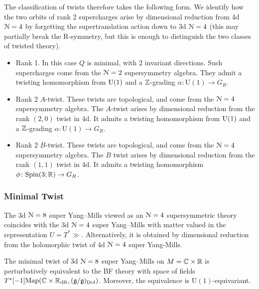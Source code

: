 \documentclass[10pt, oneside]{article}
\renewcommand{\U}{\mathrm{U}}
\begin{document}
The classification of twists therefore takes the following form.  We identify how the two orbits of rank 2 supercharges arise by dimensional reduction from 4d $\mathcal{N}=4$ by forgetting the supertranslation action down to 3d $\mathcal{N}=4$ (this may partially break the R-symmetry, but this is enough to distinguish the two classes of twisted theory).
\begin{itemize}
 \item Rank 1.  In this case $Q$ is minimal, with 2 invariant directions.  Such supercharges come from the $\mathcal{N}=2$ supersymmetry algebra.  They admit a twisting homomorphism from $\mathrm{U}(1)$ and a $\mathbb Z$-grading $\alpha \colon \U(1) \to G_R$.
 \item Rank 2 $A$-twist.  These twists are topological, and come from the $\mathcal{N}=4$ supersymmetry algebra.  The $A$-twist arises by dimensional reduction from the rank $(2,0)$ twist in 4d.  It admits a twisting homomorphism from $\mathrm{U}(1)$ and a $\mathbb Z$-grading $\alpha \colon \U(1) \to G_R$.
 \item Rank 2 $B$-twist.   These twists are topological, and come from the $\mathcal{N}=4$ supersymmetry algebra. The $B$ twist arises by dimensional reduction from the rank $(1,1)$ twist in 4d.  It admits a twisting homomorphism $\phi \colon \mathrm{Spin}(3;\mathbb R) \to G_R$.
\end{itemize}

\subsubsection{Minimal Twist}
\label{sect:3d8minimal_twist}
The 3d $\mathcal N=8$ super Yang--Mills viewed as an $\mathcal N=4$ supersymmetric theory coincides with the 3d $\mathcal N=4$ super Yang--Mills with matter valued in the representation $U = T^*\gg$.  Alternatively, it is obtained by dimensional reduction from the holomorphic twist of 4d $\mathcal{N}=4$ super Yang-Mills.

\begin{theorem} 
The minimal twist of 3d $\mathcal N=8$ super Yang--Mills on $M=\mathbb C\times \mathbb R$ is perturbatively equivalent to the BF theory with space of fields $T^*[-1]\mathrm{Map}(\mathbb C \times \mathbb R_{\mathrm{dR}}, (\mathfrak{g}/\mathfrak{g})_{\mathrm{Dol}})$. Moreover, the equivalence is $\U(1)$-equivariant.
\end{theorem}
\end{document}
